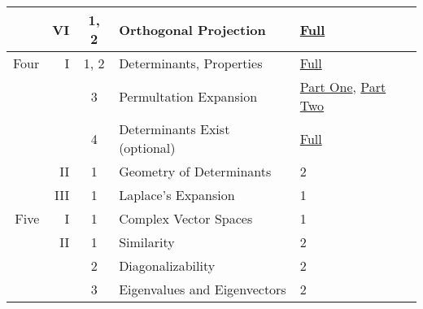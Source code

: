 \documentclass{article}
\begin{document}
\begin{center}
\begin{tabular}{|rrc|ll|}
      \cline{4-5}
      &VI  &1, 2 &Orthogonal Projection  &\href{https://youtu.be/AAjZJjByU3U}{Full}     \\
  \hline
 Four &I   &1, 2 &Determinants, Properties      &\href{https://youtu.be/BnyledMW6Ho}{Full}   \\
      &    &3 &Permultation Expansion             &\href{https://youtu.be/j1dYL2_Ud7E}{Part One}, \href{https://youtu.be/kWF2TzA0dU8}{Part Two}   \\
      &    &4 &Determinants Exist (optional)                 &\href{https://youtu.be/FMcTv4g7Goc}{Full}   \\
      \cline{4-5}
      &II  &1 &Geometry of Determinants           &2   \\
      \cline{4-5}
      &III &1 &Laplace's Expansion                &1   \\
 \hline
 Five &I   &1 &Complex Vector Spaces              &1   \\
      \cline{4-5}
      &II  &1 &Similarity                         &2   \\
      &    &2 &Diagonalizability                  &2   \\
      &    &3 &Eigenvalues and Eigenvectors       &2   \\
 \hline
\end{tabular}
\end{center}
\end{document}

